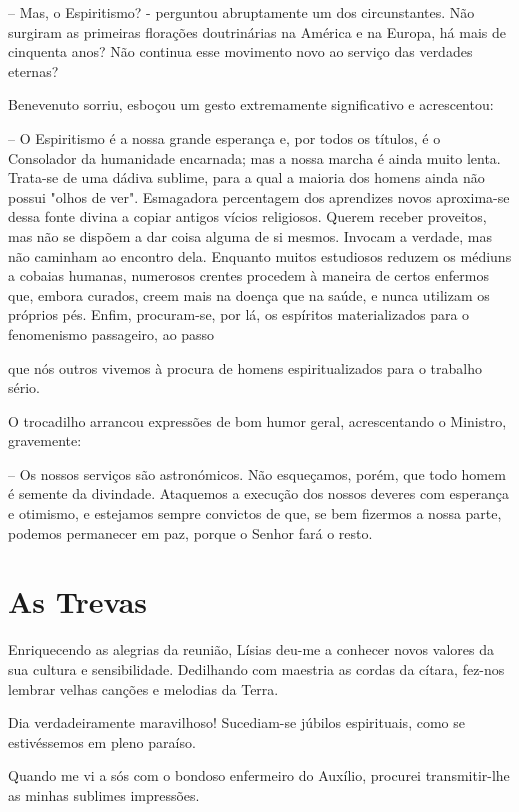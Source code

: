 \documentclass[portuguese,12pt,a4paper]{scrbook}
\begin{document}
	– Mas, o Espiritismo? - perguntou abruptamente um dos circunstantes. Não surgiram as primeiras florações doutrinárias na América e na Europa, há mais de cinquenta anos? Não continua esse movimento novo ao serviço das verdades eternas?
	
	Benevenuto sorriu, esboçou um gesto extremamente significativo e acrescentou:
	
	– O Espiritismo é a nossa grande esperança e, por todos os títulos, é o Consolador da humanidade encarnada; mas a nossa marcha é ainda muito lenta. Trata-se de uma dádiva sublime, para a qual a maioria dos homens ainda não possui "olhos de ver". Esmagadora percentagem dos aprendizes novos aproxima-se dessa fonte divina a copiar antigos vícios religiosos. Querem receber proveitos, mas não se dispõem a dar coisa alguma de si mesmos. Invocam a verdade, mas não caminham ao encontro dela. Enquanto muitos estudiosos reduzem os médiuns a cobaias humanas, numerosos crentes procedem à maneira de certos enfermos que, embora curados, creem mais na doença que na saúde, e nunca utilizam os próprios pés. Enfim, procuram-se, por lá, os espíritos materializados para o fenomenismo passageiro, ao passo
	
	
	que nós outros vivemos à procura de homens espiritualizados para o trabalho sério.
	
	O trocadilho arrancou expressões de bom humor geral, acrescentando o Ministro, gravemente:
	
	– Os nossos serviços são astronómicos. Não esqueçamos, porém, que todo homem é semente da divindade. Ataquemos a execução dos nossos deveres com esperança e otimismo, e estejamos sempre convictos de que, se bem fizermos a nossa parte, podemos permanecer em paz, porque o Senhor fará o resto.
	
	
	\chapter{As Trevas}
	
	Enriquecendo as alegrias da reunião, Lísias deu-me a conhecer novos valores da sua cultura e sensibilidade. Dedilhando com maestria as cordas da cítara, fez-nos lembrar velhas canções e melodias da Terra.
	
	Dia verdadeiramente maravilhoso! Sucediam-se júbilos espirituais, como se estivéssemos em pleno paraíso.
	
	Quando me vi a sós com o bondoso enfermeiro do Auxílio, procurei transmitir-lhe as minhas sublimes impressões.
	
\end{document}
